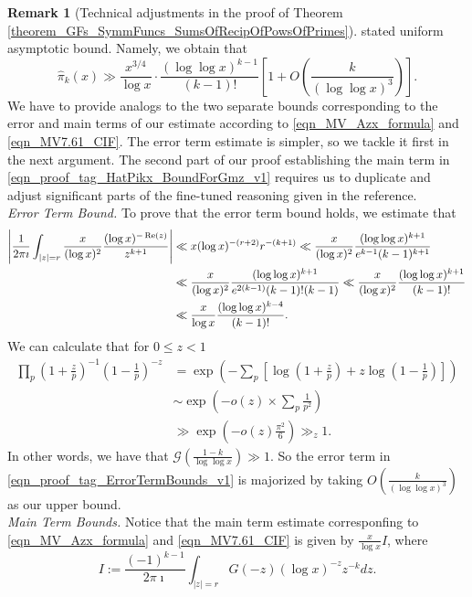 \documentclass[11pt,reqno,a4letter]{article}
\numberwithin{figure}{section}
\numberwithin{table}{section}
\theoremstyle{plain}
\numberwithin{theorem}{section}
\theoremstyle{definition}
\newtheorem{remark}[theorem]{Remark}
\renewcommand{\Re}{\operatorname{Re}}
\begin{document}
\begin{remark}[Technical adjustments in the proof of Theorem \ref{theorem_GFs_SymmFuncs_SumsOfRecipOfPowsOfPrimes}]
stated uniform asymptotic bound. Namely, we obtain that 
\[
\widehat{\pi}_k(x) \gg 
     \frac{x^{3/4}}{\log x} \cdot 
     \frac{(\log\log x)^{k-1}}{(k-1)!} \left[1 + 
     O\left(\frac{k}{(\log\log x)^3}\right)\right]. 
\]
We have to provide analogs to the two separate bounds corresponding to the error and 
main terms of our estimate according to 
\eqref{eqn_MV_Azx_formula} and \eqref{eqn_MV7.61_CIF}. 
The error term estimate is simpler, so we tackle it first in the next argument. 
The second part of our proof establishing the main term in 
\eqref{eqn_proof_tag_HatPikx_BoundForGmz_v1} 
requires us to duplicate and adjust significant parts of the 
fine-tuned reasoning given in the reference. \\ 
\textit{Error Term Bound.} 
To prove that the error term bound holds, we estimate that 
\begin{align} 
\notag 
\left\lvert \frac{1}{2\pi\imath} \int_{|z|=r} 
     \frac{x}{(\log x)^2} \frac{(\log x)^{-\Re(z)}}{z^{k+1}} \right\rvert & \ll 
     x (\log x)^{-(r+2)} r^{-(k+1)} 
     \ll \frac{x}{(\log x)^2} \frac{(\log\log x)^{k+1}}{e^{k-1} (k-1)^{k+1}} \\ 
\notag 
     & \ll \frac{x}{(\log x)^2} \frac{(\log\log x)^{k+1}}{e^{2(k-1)} (k-1)! (k-1)} 
     \ll \frac{x}{(\log x)^{2}} \frac{(\log\log x)^{k+1}}{(k-1)!} \\ 
\label{eqn_proof_tag_ErrorTermBounds_v1} 
     & \ll \frac{x}{\log x} \frac{(\log\log x)^{k-4}}{(k-1)!}. 
\end{align} 
We can calculate that for $0 \leq z < 1$ 
\begin{align*} 
\prod_p \left(1 + \frac{z}{p}\right)^{-1} \left(1 - \frac{1}{p}\right)^{-z} & = 
     \exp\left(-\sum_p \left[\log\left(1 + \frac{z}{p}\right) + z 
     \log\left(1 - \frac{1}{p}\right) \right]\right) \\ 
     & \sim \exp\left(-o(z) \times \sum_p \frac{1}{p^2}\right) \\ 
     & \gg \exp\left(-o(z) \frac{\pi^2}{6}\right) \gg_z 1. 
\end{align*} 
In other words, we have that 
$\mathcal{G}\left(\frac{1-k}{\log\log x}\right) \gg 1$. 
So the error term in \eqref{eqn_proof_tag_ErrorTermBounds_v1} 
is majorized by taking $O\left(\frac{k}{(\log\log x)^3}\right)$ as our 
upper bound. \\ 
\textit{Main Term Bounds.} 
Notice that the main term 
estimate corresponfing to \eqref{eqn_MV_Azx_formula} and \eqref{eqn_MV7.61_CIF} 
is given by $\frac{x}{\log x} I$, where 
\[
I := \frac{(-1)^{k-1}}{2\pi\imath} \int_{|z|=r} G(-z) (\log x)^{-z} z^{-k} dz. 
\]
\end{remark}
\end{document}
